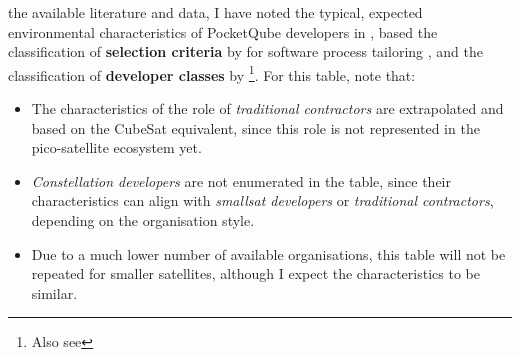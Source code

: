 \documentclass[a4paper,nobib,justified,final]{tufte-book}
\begin{document}
 the available literature and data, I have noted the typical, expected environmental characteristics of PocketQube developers in , based the classification of \textbf{selection criteria} by \citeauthor{kalusCriteriaSoftwareProcess2013} for software process tailoring \autocite{kalusCriteriaSoftwareProcess2013}, and the classification of \textbf{developer classes} by \citeauthor{swartwoutYouSayPicosat2018} \autocite{swartwoutYouSayPicosat2018}\footnote{Also see }. For this table, note that:
\begin{itemize}[itemsep=-1ex]
	\item The characteristics of the role of \emph{traditional contractors} are extrapolated and based on the CubeSat equivalent, since this role is not represented in the pico-satellite ecosystem yet.
	\item \emph{Constellation developers} are not enumerated in the table, since their characteristics can align with \emph{smallsat developers} or \emph{traditional contractors}, depending on the organisation style.
	\item Due to a much lower number of available organisations, this table will not be repeated for smaller satellites, although I expect the characteristics to be similar.
\end{itemize}
\end{document}
